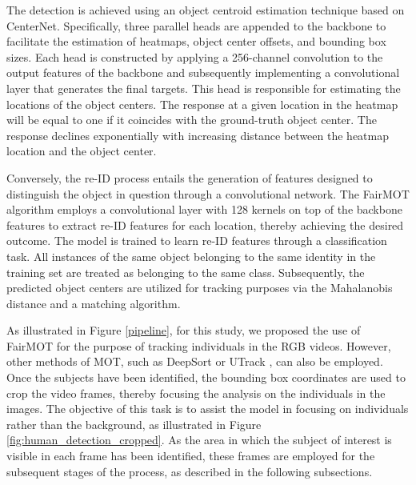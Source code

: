 \documentclass[mathematics,article,submit,pdftex,moreauthors]{Definitions/mdpi}
\begin{document}
The detection is achieved using an object centroid estimation technique based on CenterNet. Specifically, three parallel heads are appended to the backbone to facilitate the estimation of heatmaps, object center offsets, and bounding box sizes. Each head is constructed by applying a 256-channel convolution to the output features of the backbone and subsequently implementing a convolutional layer that generates the final targets. This head is responsible for estimating the locations of the object centers. The response at a given location in the heatmap will be equal to one if it coincides with the ground-truth object center. The response declines exponentially with increasing distance between the heatmap location and the object center.

Conversely, the re-ID process entails the generation of features designed to distinguish the object in question through a convolutional network. The FairMOT algorithm employs a convolutional layer with 128 kernels on top of the backbone features to extract re-ID features for each location, thereby achieving the desired outcome. The model is trained to learn re-ID features through a classification task. All instances of the same object belonging to the same identity in the training set are treated as belonging to the same class.  Subsequently, the predicted object centers are utilized for tracking purposes via the Mahalanobis distance and a matching algorithm.




As illustrated in Figure \ref{pipeline}, for this study, we proposed the use of FairMOT for the purpose of tracking individuals in the RGB videos. However, other methods of MOT, such as DeepSort \cite{Wojke2017simple} or UTrack \cite{LIU2022333}, can also be employed. Once the subjects have been identified, the bounding box coordinates are used to crop the video frames, thereby focusing the analysis on the individuals in the images. The objective of this task is to assist the model in focusing on individuals rather than the background, as illustrated in Figure \ref{fig:human_detection_cropped}. As the area in which the subject of interest is visible in each frame has been identified, these frames are employed for the subsequent stages of the process, as described in the following subsections.
\end{document}
